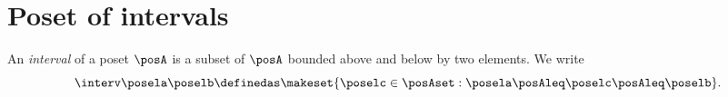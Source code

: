 
\section{Poset of intervals}
\begin{definition}[Interval]
    \label{def:interval}
    An \emph{interval} of a poset $\posA$ is a subset of $\posA$ bounded above and below by two elements.
    We write
    \begin{equation}
        \interv \posela \poselb
        \definedas
        \makeset{
            \poselc \in \posAset :
            \posela \posAleq \poselc \posAleq \poselb
        }.
    \end{equation}
\end{definition}


